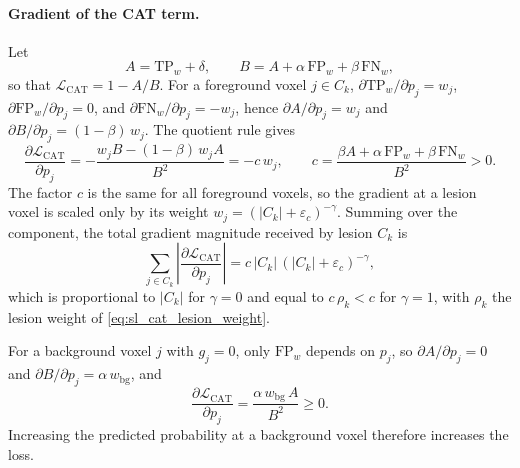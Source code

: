 \paragraph{Gradient of the CAT term.}
Let
\begin{equation}
A = \mathrm{TP}_{w}+\delta,
\qquad
B = A + \alpha\, \mathrm{FP}_{w} + \beta\, \mathrm{FN}_{w},
\end{equation}
so that $\mathcal{L}_{\mathrm{CAT}} = 1 - A/B$. For a foreground voxel
$j \in C_k$, $\partial \mathrm{TP}_{w}/\partial p_j = w_j$,
$\partial \mathrm{FP}_{w}/\partial p_j = 0$, and
$\partial \mathrm{FN}_{w}/\partial p_j = -w_j$, hence
$\partial A/\partial p_j = w_j$ and
$\partial B/\partial p_j = (1-\beta)\, w_j$. The quotient rule gives
\begin{equation}
\frac{\partial \mathcal{L}_{\mathrm{CAT}}}{\partial p_j}
=
-\frac{w_j B - (1-\beta)\, w_j A}{B^2}
=
-c\, w_j ,
\qquad
c
=
\frac{\beta A + \alpha\, \mathrm{FP}_{w} + \beta\, \mathrm{FN}_{w}}{B^2}
> 0 .
\end{equation}
The factor $c$ is the same for all foreground voxels, so the gradient at a
lesion voxel is scaled only by its weight
$w_j = (|C_k|+\varepsilon_{c})^{-\gamma}$. Summing over the component, the
total gradient magnitude received by lesion $C_k$ is
\begin{equation}
\sum_{j \in C_k}
\left| \frac{\partial \mathcal{L}_{\mathrm{CAT}}}{\partial p_j} \right|
=
c\, |C_k|\, (|C_k|+\varepsilon_{c})^{-\gamma},
\end{equation}
which is proportional to $|C_k|$ for $\gamma=0$ and equal to
$c\,\rho_k < c$ for $\gamma=1$, with $\rho_k$ the lesion weight of
\cref{eq:sl_cat_lesion_weight}.

For a background voxel $j$ with $g_j=0$, only $\mathrm{FP}_{w}$ depends on
$p_j$, so $\partial A/\partial p_j = 0$ and
$\partial B/\partial p_j = \alpha\, w_{\mathrm{bg}}$, and
\begin{equation}
\frac{\partial \mathcal{L}_{\mathrm{CAT}}}{\partial p_j}
=
\frac{\alpha\, w_{\mathrm{bg}}\, A}{B^2}
\geq 0 .
\end{equation}
Increasing the predicted probability at a background voxel therefore
increases the loss.

